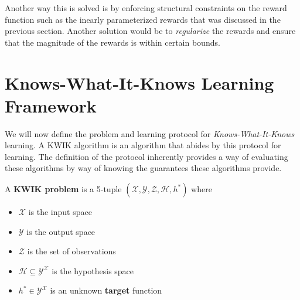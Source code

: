 Another way this is solved is by enforcing structural constraints on the reward function such as the inearly parameterized rewards that was discussed in the previous section. Another solution would be to \textit{regularize} the rewards and ensure that the magnitude of the rewards is within certain bounds. 


\section{Knows-What-It-Knows Learning Framework}
\label{sec:kwik_prel}
We will now define the problem and learning protocol for \textit{Knows-What-It-Knows} learning. A KWIK algorithm is an algorithm that abides by this protocol for learning. The definition of the protocol inherently provides a way of evaluating these algorithms by way of knowing the guarantees these algorithms provide. 

\begin{dfn}
A \textbf{KWIK problem} is a 5-tuple $(\mathcal{X}, \mathcal{Y}, \mathcal{Z}, \mathcal{H}, h^*)$ where
\begin{itemize}
\item $\mathcal{X}$ is the input space
\item $\mathcal{Y}$ is the output space
\item $\mathcal{Z}$ is the set of observations
\item $\mathcal{H} \subseteq \mathcal{Y}^{\mathcal{X}}$ is the hypothesis space
\item $h^* \in \mathcal{Y}^{\mathcal{X}}$ is an unknown \textbf{target} function
\end{itemize}
\end{dfn}

